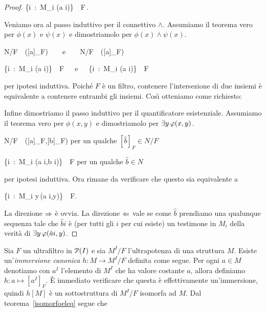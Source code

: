 \begin{proof}
\ceq{}{\IFF}%
{\big\{i\ :\ M_i\; \models\; \neg\phi(\hat a i)\;\big\}\ \in\ F\,.}


Veniamo ora al passo induttivo per il connettivo $\wedge$. Assumiamo il teorema vero per $\phi(x)$ e $\psi(x)$ e dimostriamolo per $\phi(x)\wedge\psi(x)$.

%
{\IFF}%
{N/F\ \models\ \phi\big([\hat a]_F\big)\ \ \ \ {\rm e}\ \ \ \ N/F\ \models\ \psi\big([\hat a]_F\big)}

\ceq{}{\IFF}%
{\big\{i\ :\ M_i\; \models\; \phi(\hat a i)\;\big\}\ \in\ F\ \ \ {\rm e}\ \ \ \big\{i\ :\ M_i\; \models\; \psi(\hat a i)\;\big\}\ \in\ F}

per ipotesi induttiva. Poich\'e $F$ \`e un filtro, contenere l'intersezione di due insiemi \`e equivalente a contenere entrambi gli insiemi. Cos\`{\i} otteniamo come richiesto: 


 
Infine dimostriamo il passo induttivo per il quantificatore esistenziale.  Assumiamo il teorema vero per $\phi(x,y)$ e dimostriamolo per $\E y\,\phi(x,y)$.

%
{\IFF}%
{N/F\ \models\  \phi\big([\hat a]_F,[\hat b]_F\big)}\hspace{5ex} per un qualche $[\hat b]_F\in N/F$

\ceq{}{\IFF}%
{\big\{i\ :\ M_i\; \models\; \phi(\hat a i,\hat b i)\;\big\}\ \in\ F}\hspace{5ex} per un qualche $\hat b\in N$

per ipotesi induttiva. Ora rimane da verificare che questo sia equivalente a 

\ceq{}{\IFF}%
{\big\{i\ :\ M_i\; \models\; \E y\,\phi(\hat a i,y)\;\big\}\ \in\ F.}

La direzione $\IMP$ \`e ovvia. La direzione $\PMI$ vale se come $\hat b$ prendiamo una qualunque sequenza tale che $\hat bi$ \`e (per tutti gli $i$ per cui esiste) un testimone in $M_i$ della verit\`a di $\E y\,\phi(\hat a i,y)$.
\end{proof}

Sia $F$ un ultrafiltro in $\P(I)$ e sia $M^I/F$ l'ultrapotenza di una struttura $M$. Esiste un'\emph{im\-mer\-sione canonica\/} $h:M\to M^I/F$ definita come segue. Per ogni $a\in M$ denotiamo con \emph{$a^I$\/} l'elemento di $M^I$ che ha valore costante $a$, allora definiamo $h:a\mapsto [a^I]_F$. \`E immediato verificare che questa \`e effettivamente un'immersione, quindi $h[M]$ \`e un sottostruttura di $M^I/F$ isomorfa ad $M$. Dal teorema~\ref{isomorfoeleq} segue che

